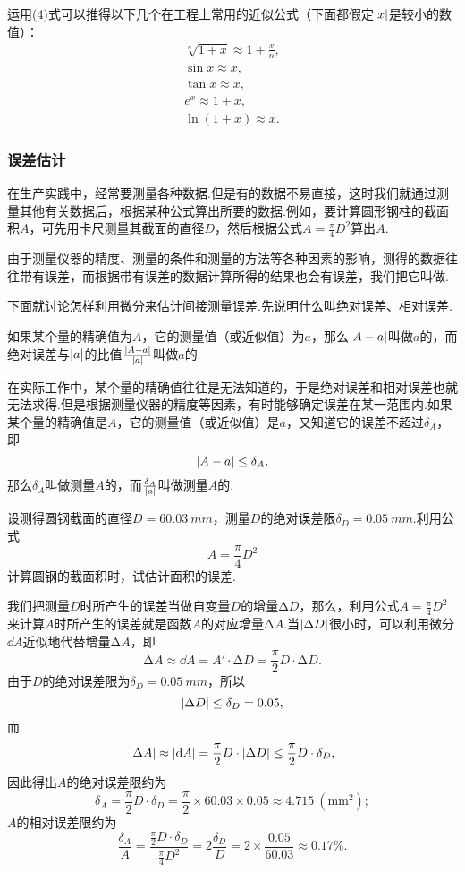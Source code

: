 运用(4)式可以推得以下几个在工程上常用的近似公式（下面都假定\(\abs{x}\)是较小的数值）：
\begin{gather}
\sqrt[n]{1+x} \approx 1 + \frac{x}{n}, \\
\sin x \approx x, \\
\tan x \approx x, \\
e^x \approx 1 + x, \\
\ln (1 + x) \approx x.
\end{gather}

\subsubsection{误差估计}
在生产实践中，经常要测量各种数据.但是有的数据不易直接，这时我们就通过测量其他有关数据后，根据某种公式算出所要的数据.例如，要计算圆形钢柱的截面积\(A\)，可先用卡尺测量其截面的直径\(D\)，然后根据公式\(A = \frac{\pi}{4} D^2\)算出\(A\).

由于测量仪器的精度、测量的条件和测量的方法等各种因素的影响，测得的数据往往带有误差，而根据带有误差的数据计算所得的结果也会有误差，我们把它叫做.

下面就讨论怎样利用微分来估计间接测量误差.先说明什么叫绝对误差、相对误差.

如果某个量的精确值为\(A\)，它的测量值（或近似值）为\(a\)，那么\(\abs{A-a}\)叫做\(a\)的，而绝对误差与\(\abs{a}\)的比值\(\frac{\abs{A-a}}{\abs{a}}\)叫做\(a\)的.

在实际工作中，某个量的精确值往往是无法知道的，于是绝对误差和相对误差也就无法求得.但是根据测量仪器的精度等因素，有时能够确定误差在某一范围内.如果某个量的精确值是\(A\)，它的测量值（或近似值）是\(a\)，又知道它的误差不超过\(\delta_A\)，即\[
\abs{A-a} \leq \delta_A,
\]那么\(\delta_A\)叫做测量\(A\)的，而\(\frac{\delta_A}{\abs{a}}\)叫做测量\(A\)的.

\begin{example}
设测得圆钢截面的直径\(D = 60.03\ mm\)，测量\(D\)的绝对误差限\(\delta_D = 0.05\ mm\).利用公式\[
A = \frac{\pi}{4} D^2
\]计算圆钢的截面积时，试估计面积的误差.
\begin{solution}
我们把测量\(D\)时所产生的误差当做自变量\(D\)的增量\(\increment D\)，那么，利用公式\(A = \frac{\pi}{4} D^2\)来计算\(A\)时所产生的误差就是函数\(A\)的对应增量\(\increment A\).当\(\abs{\Delta D}\)很小时，可以利用微分\(\dd A\)近似地代替增量\(\increment A\)，即\[
\increment A \approx \dd A = A' \cdot \increment D = \frac{\pi}{2} D \cdot \increment D.
\]由于\(D\)的绝对误差限为\(\delta_D = 0.05\ mm\)，所以\[
\abs{\Delta D} \leq \delta_D = 0.05,
\]而\[
\abs{\Delta A} \approx \abs{\dd A} = \frac{\pi}{2} D \cdot \abs{\Delta D} \leq \frac{\pi}{2} D \cdot \delta_D,
\]因此得出\(A\)的绝对误差限约为\[
\delta_A = \frac{\pi}{2} D \cdot \delta_D = \frac{\pi}{2} \times 60.03 \times 0.05 \approx 4.715\ (\mathrm{mm}^2);
\]\(A\)的相对误差限约为\[
\frac{\delta_A}{A} = \frac{\frac{\pi}{2} D \cdot \delta_D}{\frac{\pi}{4} D^2}
= 2 \frac{\delta_D}{D} = 2 \times \frac{0.05}{60.03} \approx 0.17\%.
\]
\end{solution}
\end{example}

